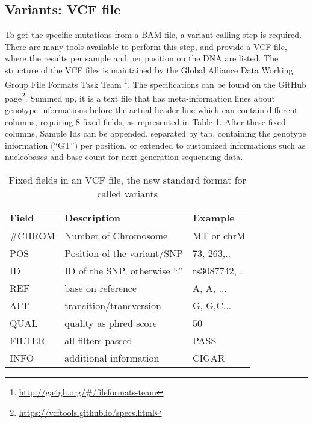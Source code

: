 \subsection{Variants: VCF file}\label{intro:VCF}
To get the specific mutations from a BAM file, a variant calling step is required. There are many tools available to perform this step, and provide a VCF file, where the results per sample and per position on the DNA are listed. The structure of the VCF files is maintained by the Global Alliance Data Working Group File Formats Task Team \footnote{\url{http://ga4gh.org/\#/fileformats-team}}. The specifications can be found on the GitHub page\footnote{\url{https://vcftools.github.io/specs.html}}. Summed up, it is a text file that has meta-information lines about genotype informations before the actual header line which can contain different columns, requiring 8 fixed fields, as represented in Table \ref{table:vcf}. After these fixed columns, Sample Ids can be appended, separated by tab, containing the genotype information ("`GT"') per position, or extended to customized informations such as nucleobases and base count for next-generation sequencing data.

\begin{table}[H]
  \begin{tabular}{lll}
    \toprule
    Field & Description & Example \\
		\midrule
    \#CHROM & Number of Chromosome & MT or chrM \\
    POS & Position of the variant/SNP & 73, 263,.. \\
    ID & ID of the SNP, otherwise "`."' & rs3087742, .\\
    REF & base on reference & A, A, ...\\
    ALT & transition/transversion & G, G,C...\\
    QUAL & quality as phred score & 50 \\
    FILTER & all filters passed & PASS \\
    INFO & additional information & CIGAR \\
		\bottomrule
\end{tabular}
\caption{Fixed fields in an VCF file, the new standard format for called variants}
\label{table:vcf}
\end{table}

